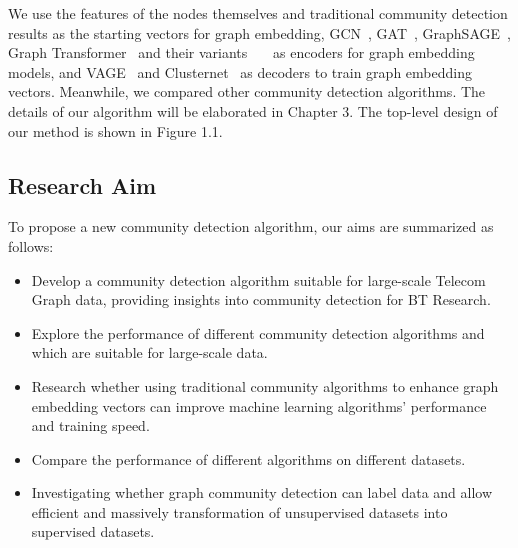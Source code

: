 \documentclass[ %
                    author={Tengyao Tu},
                supervisor={Dr. James Pope},
                    degree={MSc},
                     title={A New Perspective on Graph Community Detection: Combining Traditional Methods with Deep Learning Approaches},
                  subtitle={Applying to Telecom Networks and Diverse Datasets},
                      type={},
                      year={2024}]{dissertation}
\begin{document}
We use the features of the nodes themselves and traditional community detection results as the starting vectors for graph embedding, GCN~\cite{kipf2016semi}, GAT~\cite{velivckovic2017graph}, GraphSAGE~\cite{hamilton2017inductive}, Graph Transformer~\cite{yun2019graph} and their variants~\cite{zhu2020hgcn}~\cite{yang2021hgat}~\cite{hu2020heterogeneous} as encoders for graph embedding models, and VAGE~\cite{kipf2016variational} and Clusternet~\cite{wilder2019end} as decoders to train graph embedding vectors. Meanwhile, we compared other community detection algorithms. The details of our algorithm will be elaborated in Chapter 3. The top-level design of our method is shown in Figure 1.1.
\subsection{Research Aim}
To propose a new community detection algorithm, our aims are summarized as follows:
\begin{itemize}
\item Develop a community detection algorithm suitable for large-scale Telecom Graph data, providing insights into community detection for BT Research.
\item Explore the performance of different community detection algorithms and which are suitable for large-scale data.
\item Research whether using traditional community algorithms to enhance graph embedding vectors can improve machine learning algorithms' performance and training speed.
\item Compare the performance of different algorithms on different datasets.
\item Investigating whether graph community detection can label data and allow efficient and massively transformation of unsupervised datasets into supervised datasets.

\end{itemize}
\end{document}
